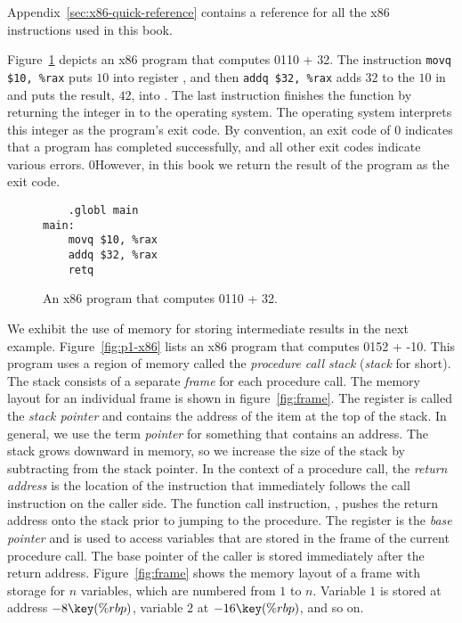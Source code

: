 \documentclass[7x10]{TimesAPriori_MIT}%
\def\racketEd{0}
\def\pythonEd{1}
\def\edition{1}
\newcommand{\racket}[1]{{\if\edition\racketEd{#1}\fi}}
\newcommand{\pythonColor}[0]{}
\newcommand{\python}[1]{{\if\edition\pythonEd\pythonColor #1\fi}}
\numberwithin{theorem}{chapter}
\numberwithin{definition}{chapter}
\numberwithin{equation}{chapter}
\begin{document}
Appendix~\ref{sec:x86-quick-reference} contains a reference for
all the x86 instructions used in this book.

Figure~\ref{fig:p0-x86} depicts an x86 program that computes
\racket{}\python{10 + 32}. The instruction
\lstinline{movq $10, %rax}
puts $10$ into register , and then \lstinline{addq $32, %rax}
adds $32$ to the $10$ in  and
puts the result, $42$, into .
%
The last instruction  finishes the  function by
returning the integer in  to the operating system. The
operating system interprets this integer as the program's exit
code. By convention, an exit code of 0 indicates that a program has
completed successfully, and all other exit codes indicate various
errors.
%
\racket{However, in this book we return the result of the program
  as the exit code.}

\begin{figure}[tbp]
\begin{minipage}{0.45\textwidth}
\begin{tcolorbox}[colback=white]
\begin{lstlisting}
    .globl main
main:
    movq $10, %rax
    addq $32, %rax
    retq
\end{lstlisting}
\end{tcolorbox}
\end{minipage}

\caption{An x86 program that computes
  \racket{}\python{10 + 32}.}
\label{fig:p0-x86}
\end{figure}

We exhibit the use of memory for storing intermediate results in the
next example.  Figure~\ref{fig:p1-x86} lists an x86 program that
computes \racket{}\python{52 + -10}. This program
uses a region of memory called the \emph{procedure call stack}
(\emph{stack} for
short). 
The stack consists of a separate \emph{frame}
for each procedure call. The memory layout for an individual frame is
shown in figure~\ref{fig:frame}.  The register  is called the
\emph{stack pointer} and contains the
address of the item at the top of the stack.  In general, we use the
term \emph{pointer} for something that
contains an address. The stack grows downward in memory, so we
increase the size of the stack by subtracting from the stack pointer.
In the context of a procedure call, the \emph{return
  address} is the location of the
instruction that immediately follows the call instruction on the
caller side.  The function call instruction, , pushes the
return address onto the stack prior to jumping to the procedure.  The
register  is the \emph{base pointer} and is used to access variables that are stored in the
frame of the current procedure call.  The base pointer of the caller
is stored immediately after the return address.
Figure~\ref{fig:frame} shows the memory layout of a frame with storage
for $n$ variables, which are numbered from $1$ to $n$. Variable $1$ is
stored at address $-8\key{(\%rbp)}$, variable $2$ at
$-16\key{(\%rbp)}$, and so on.
\end{document}
